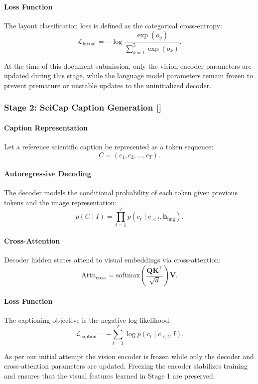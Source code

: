 \documentclass[12pt, titlepage]{article}
\begin{document}
\paragraph{Loss Function}
The layout classification loss is defined as the categorical cross-entropy:
\[
\mathcal{L}_{\text{layout}} =
- \log \frac{\exp(o_y)}{\sum_{k=1}^{5} \exp(o_k)}.
\]

At the time of this document submission, only the vision encoder parameters are updated during this stage, while the language model parameters remain frozen to prevent premature or unstable updates to the uninitialized decoder.

\subsubsection{Stage 2: SciCap Caption Generation [\cite{hsu-etal-2021-scicap-generating}]}

\paragraph{Caption Representation}
Let a reference scientific caption be represented as a token sequence:
\[
C = (c_1, c_2, \dots, c_T).
\]

\paragraph{Autoregressive Decoding}
The decoder models the conditional probability of each token given previous
tokens and the image representation:
\[
p(C \mid I) = \prod_{t=1}^{T} p(c_t \mid c_{<t}, \mathbf{h}_{\text{img}}).
\]

\paragraph{Cross-Attention}
Decoder hidden states attend to visual embeddings via cross-attention:
\[
\text{Attn}_{\text{cross}} =
\text{softmax}\left(
\frac{\mathbf{Q}\mathbf{K}^\top}{\sqrt{d}}
\right)\mathbf{V}.
\]

\paragraph{Loss Function}
The captioning objective is the negative log-likelihood:
\[
\mathcal{L}_{\text{caption}} =
- \sum_{t=1}^{T} \log p(c_t \mid c_{<t}, I).
\]

As per our initial attempt the vision encoder is frozen while only the decoder and cross-attention parameters are updated. Freezing the encoder stabilizes training and ensures that the visual features learned in Stage 1 are preserved.
\end{document}
